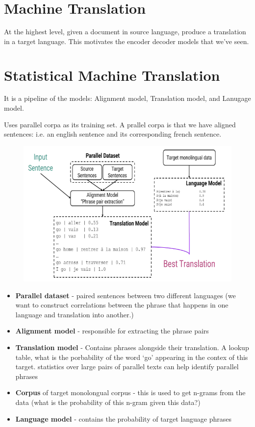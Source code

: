 \documentclass[11pt]{article}
\begin{document}


\tableofcontents

\clearpage

\section{Machine Translation}

At the highest level, given a document in source language, produce a translation in a target language. This motivates the encoder decoder models that we've seen.

\section{Statistical Machine Translation}

It is a pipeline of the models: Alignment model, Translation model, and Lanugage model.

Uses parallel corpa as its training set. A prallel corpa is that we have aligned sentences: i.e. an english sentence and its corresponding french sentence.

\begin{figure}[H]
    \centering
    \includegraphics*[width=.6\linewidth]{figures/smt-idea.png}
\end{figure}

\begin{itemize}
    \item \textbf{Parallel dataset} - paired sentences between two different languages (we want to construct correlations between the phrase that happens in one language and translation into another.)
    \item \textbf{Alignment model} - responsible for extracting the phrase pairs    
    \item \textbf{Translation model} - Contains phrases alongside their translation. A lookup table, what is the porbability of the word `go' appearing in the contex of this target. statistics over large pairs of parallel texts can
    help identify parallel phrases
    \item \textbf{Corpus} of target monolongual corpus - this is used to get n-grams from the data (what is the probability of this n-gram given this data?)
    \item \textbf{Language model} - contains the probability of target language phrases 
\end{itemize}
\end{document}
